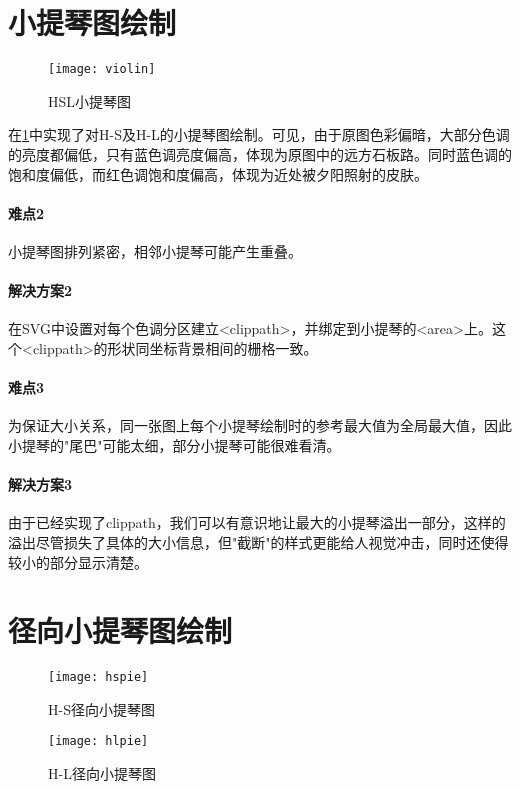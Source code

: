 \documentclass[a4paper,12pt]{article}
\begin{document}
    \section{小提琴图绘制}
    \begin{figure}[htbp]
      \centering
      \texttt{[image: violin]}
      \caption{HSL小提琴图}
      \label{fig:violin}
    \end{figure}

    在\cref{fig:violin}中实现了对H-S及H-L的小提琴图绘制。可见，由于原图色彩偏暗，大部分色调的亮度都偏低，只有蓝色调亮度偏高，体现为原图中的远方石板路。同时蓝色调的饱和度偏低，而红色调饱和度偏高，体现为近处被夕阳照射的皮肤。

    \paragraph{难点2} 小提琴图排列紧密，相邻小提琴可能产生重叠。
    \paragraph{解决方案2} 在SVG中设置对每个色调分区建立<clippath>，并绑定到小提琴的<area>上。这个<clippath>的形状同坐标背景相间的栅格一致。

    \paragraph{难点3} 为保证大小关系，同一张图上每个小提琴绘制时的参考最大值为全局最大值，因此小提琴的"尾巴"可能太细，部分小提琴可能很难看清。
    \paragraph{解决方案3} 由于已经实现了clippath，我们可以有意识地让最大的小提琴溢出一部分，这样的溢出尽管损失了具体的大小信息，但"截断"的样式更能给人视觉冲击，同时还使得较小的部分显示清楚。
    \section{径向小提琴图绘制}
    \begin{figure}[htbp]
      \centering
      \texttt{[image: hspie]}
      \caption{H-S径向小提琴图}
      \label{fig:hspie}
    \end{figure}
    \begin{figure}[htbp]
      \centering
      \texttt{[image: hlpie]}
      \caption{H-L径向小提琴图}
      \label{fig:hlpie}
    \end{figure}
\end{document}
